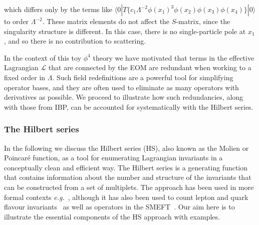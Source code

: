 which differs only by the terms like
$\langle 0 | T \{ c_{1} \Lambda^{-2} \phi(x_{1})^{3} \phi(x_{2}) \phi(x_{3}) \phi(x_{4}) \} | 0 \rangle$
to order $\Lambda^{-2}$. These matrix elements do not affect the $S$-matrix,
since the singularity structure is different. In this case, there is no
single-particle pole at $x_{1}$, and so there is no contribution to scattering.

In the context of this toy $\phi^{4}$ theory we have motivated that terms in the
effective Lagrangian $\mathscr{L}$ that are connected by the EOM are redundant
when working to a fixed order in $\Lambda$. Such field redefinitions are a
powerful tool for simplifying operator bases, and they are often used to
eliminate as many operators with derivatives as possible. We proceed to
illustrate how such redundancies, along with those from IBP, can be accounted
for systematically with the Hilbert series.

\subsubsection{The Hilbert series}
\label{sec:ch1-the-hs}


In the following we discuss the Hilbert series (HS), also known as the Molien or
Poincar\'{e} function, as a tool for enumerating Lagrangian invariants in a
conceptually clean and efficient way. The Hilbert series is a generating
function that contains information about the number and structure of the
invariants that can be constructed from a set of multiplets. The approach has
been used in more formal contexts \textit{e.g.}~\cite{Pouliot:1998yv,
  Benvenuti:2006qr, Dolan:2007rq}, although it has also been used to count
lepton and quark flavour invariants~\cite{Hanany:2010vu, Jenkins:2009dy} as well
as operators in the SMEFT~\cite{Henning:2015alf}. Our aim here is to illustrate
the essential components of the HS approach with examples.

